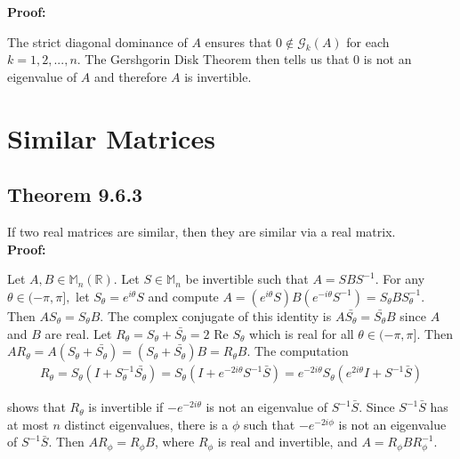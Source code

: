 \documentclass[12pt, letterpaper]{article}
\begin{document}
\noindent \textbf{Proof: }

The strict diagonal dominance of $A$ ensures that $0\notin\mathcal{G}_k(A)$ for each $k=1,2,...,n$. 
The Gershgorin Disk Theorem then tells us that 0 is not an eigenvalue of $A$ and therefore $A$ is invertible.

\section{Similar Matrices}
\subsection{Theorem 9.6.3}
If two real matrices are similar, then they are similar via a real matrix. \\

\noindent \textbf{Proof:}

Let $A,B \in \mathbb{M}_n(\mathbb{R})$. Let $S\in \mathbb{M}_n$ be invertible such that $A=SBS^{-1}$.
For any $\theta \in (-\pi, \pi ],$ let $S_\theta = e^{i\theta}S$ and compute $A = (e^{i\theta}S)B(e^{-i\theta}S^{-1})=S_\theta B S_\theta ^{-1}$.
Then $AS_\theta = S_\theta B$. The complex conjugate of this identity is $A\bar{S_\theta}=\bar{S_\theta}B$ since $A$ and $B$ are real.
Let $R_\theta=S_\theta+\bar{S_\theta} = 2\text{ Re } S_\theta $ which is real for all $\theta\in (-\pi,\pi]$. 
Then $AR_\theta = A(S_\theta + \bar{S_\theta})=(S_\theta + \bar{S_\theta})B=R_\theta B$. The computation 
\begin{align*}
    R_\theta = S_\theta(I+S_\theta^{-1}\bar{S_\theta}) = S_\theta (I+e^{-2i\theta}S^{-1}\bar S)= e^{-2i\theta}S_\theta(e^{2i\theta}I+S^{-1}\bar S)
\end{align*}

\noindent shows that $R_\theta$ is invertible if $-e^{-2i\theta}$ is not an eigenvalue of $S^{-1}\bar S$. Since $S^{-1}\bar S$ has at most $n$ distinct eigenvalues, 
there is a $\phi$ such that $-e^{-2i\phi}$ is not an eigenvalue of $S^{-1}\bar S$. Then $AR_\phi = R_\phi B$, where $R_\phi$ is real and invertible, and $A=R_\phi BR_\phi^{-1}$.
\end{document}
